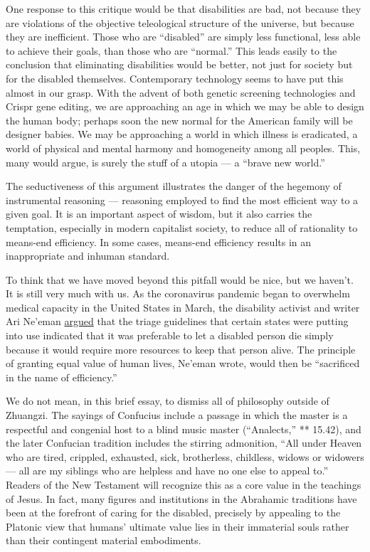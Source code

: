 One response to this critique would be that disabilities are bad, not
because they are violations of the objective teleological structure of
the universe, but because they are inefficient. Those who are
``disabled'' are simply less functional, less able to achieve their
goals, than those who are ``normal.'' This leads easily to the
conclusion that eliminating disabilities would be better, not just for
society but for the disabled themselves. Contemporary technology seems
to have put this almost in our grasp. With the advent of both genetic
screening technologies and Crispr gene editing, we are approaching an
age in which we may be able to design the human body; perhaps soon the
new normal for the American family will be designer babies. We may be
approaching a world in which illness is eradicated, a world of physical
and mental harmony and homogeneity among all peoples. This, many would
argue, is surely the stuff of a utopia --- a ``brave new world.''

The seductiveness of this argument illustrates the danger of the
hegemony of instrumental reasoning --- reasoning employed to find the
most efficient way to a given goal. It is an important aspect of wisdom,
but it also carries the temptation, especially in modern capitalist
society, to reduce all of rationality to means-end efficiency. In some
cases, means-end efficiency results in an inappropriate and inhuman
standard.

To think that we have moved beyond this pitfall would be nice, but we
haven't. It is still very much with us. As the coronavirus pandemic
began to overwhelm medical capacity in the United States in March, the
disability activist and writer Ari Ne'eman
\href{https://www.nytimes.com/2020/03/23/opinion/coronavirus-ventilators-triage-disability.html}{argued}
that the triage guidelines that certain states were putting into use
indicated that it was preferable to let a disabled person die simply
because it would require more resources to keep that person alive. The
principle of granting equal value of human lives, Ne'eman wrote, would
then be ``sacrificed in the name of efficiency.''

We do not mean, in this brief essay, to dismiss all of philosophy
outside of Zhuangzi. The sayings of Confucius include a passage in which
the master is a respectful and congenial host to a blind music master
(``Analects,'' ** 15.42), and the later Confucian tradition includes the
stirring admonition, ``All under Heaven who are tired, crippled,
exhausted, sick, brotherless, childless, widows or widowers --- all are
my siblings who are helpless and have no one else to appeal to.''
Readers of the New Testament will recognize this as a core value in the
teachings of Jesus. In fact, many figures and institutions in the
Abrahamic traditions have been at the forefront of caring for the
disabled, precisely by appealing to the Platonic view that humans'
ultimate value lies in their immaterial souls rather than their
contingent material embodiments.

